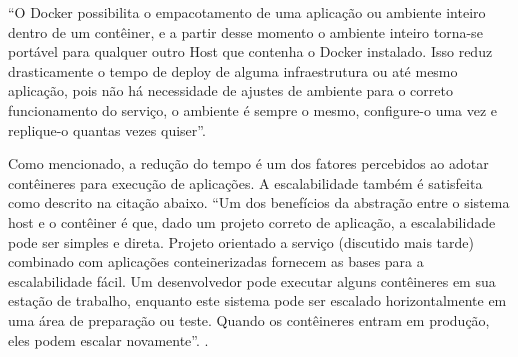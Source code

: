 “O Docker possibilita o empacotamento de uma aplicação ou ambiente inteiro dentro de um contêiner, e a partir desse momento o
ambiente inteiro torna-se portável para qualquer outro Host que contenha o Docker instalado.
Isso reduz drasticamente o tempo de deploy de alguma infraestrutura ou até mesmo aplicação, pois não há necessidade de ajustes
de ambiente para o correto funcionamento do serviço, o ambiente é sempre o mesmo, configure-o uma vez e replique-o quantas vezes
quiser”. \cite {mundodocker-02}


Como mencionado, a redução do tempo é um dos fatores percebidos ao adotar contêineres para execução de aplicações. A
escalabilidade também é satisfeita como descrito na citação abaixo.
“Um dos benefícios da abstração entre o sistema host e o contêiner é que, dado um projeto correto de aplicação, a
escalabilidade pode ser simples e direta. Projeto orientado a serviço (discutido mais tarde) combinado com aplicações
conteinerizadas fornecem as bases para a escalabilidade fácil.
Um desenvolvedor pode executar alguns contêineres em sua estação de trabalho, enquanto este sistema pode ser escalado
horizontalmente em uma área de preparação ou teste. Quando os contêineres entram em produção, eles podem escalar novamente”. \cite {digitalocean-01}.
